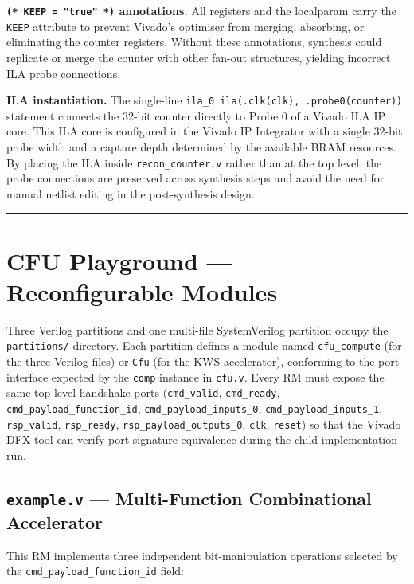 \textbf{\texttt{(* KEEP = "true" *)} annotations.} All registers and the localparam carry the \texttt{KEEP} attribute to prevent Vivado's optimiser from merging, absorbing, or eliminating the counter registers. Without these annotations, synthesis could replicate or merge the counter with other fan-out structures, yielding incorrect ILA probe connections.

\textbf{ILA instantiation.} The single-line \texttt{ila\_0 ila(.clk(clk), .probe0(counter))} statement connects the 32-bit counter directly to Probe 0 of a Vivado ILA IP core. This ILA core is configured in the Vivado IP Integrator with a single 32-bit probe width and a capture depth determined by the available BRAM resources. By placing the ILA inside \texttt{recon\_counter.v} rather than at the top level, the probe connections are preserved across synthesis steps and avoid the need for manual netlist editing in the post-synthesis design.

\vspace{0.4em}\hrule\vspace{0.4em}

\section{CFU Playground — Reconfigurable Modules}

Three Verilog partitions and one multi-file SystemVerilog partition occupy the \texttt{partitions/} directory. Each partition defines a module named \texttt{cfu\_compute} (for the three Verilog files) or \texttt{Cfu} (for the KWS accelerator), conforming to the port interface expected by the \texttt{comp} instance in \texttt{cfu.v}. Every RM must expose the same top-level handshake ports (\texttt{cmd\_valid}, \texttt{cmd\_ready}, \texttt{cmd\_payload\_function\_id}, \texttt{cmd\_payload\_inputs\_0}, \texttt{cmd\_payload\_inputs\_1}, \texttt{rsp\_valid}, \texttt{rsp\_ready}, \texttt{rsp\_payload\_outputs\_0}, \texttt{clk}, \texttt{reset}) so that the Vivado DFX tool can verify port-signature equivalence during the child implementation run.

\subsection{\texttt{example.v} — Multi-Function Combinational Accelerator}

This RM implements three independent bit-manipulation operations selected by the \texttt{cmd\_payload\_function\_id} field:


